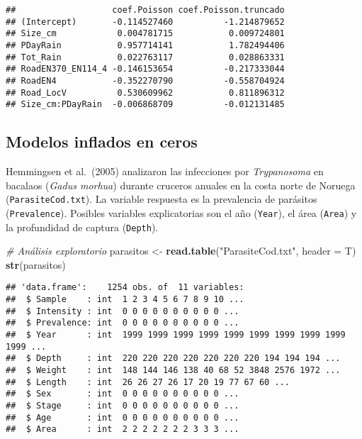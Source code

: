 \documentclass[
]{book}
\newenvironment{Shaded}{\begin{snugshade}}{\end{snugshade}}
\newcommand{\CommentTok}[1]{\textcolor[rgb]{0.56,0.35,0.01}{\textit{#1}}}
\newcommand{\DataTypeTok}[1]{\textcolor[rgb]{0.13,0.29,0.53}{#1}}
\newcommand{\KeywordTok}[1]{\textcolor[rgb]{0.13,0.29,0.53}{\textbf{#1}}}
\newcommand{\NormalTok}[1]{#1}
\newcommand{\StringTok}[1]{\textcolor[rgb]{0.31,0.60,0.02}{#1}}
\begin{document}
\begin{verbatim}
##                   coef.Poisson coef.Poisson.truncado
## (Intercept)       -0.114527460          -1.214879652
## Size_cm            0.004781715           0.009724801
## PDayRain           0.957714141           1.782494406
## Tot_Rain           0.022763117           0.028863331
## RoadEN370_EN114_4 -0.146153654          -0.217333044
## RoadEN4           -0.352270790          -0.558704924
## Road_LocV          0.530609962           0.811896312
## Size_cm:PDayRain  -0.006868709          -0.012131485
\end{verbatim}

\hypertarget{modelos-inflados-en-ceros}{%
\subsection{Modelos inflados en ceros}\label{modelos-inflados-en-ceros}}

Hemmingsen et al.~(2005) analizaron las infecciones por \emph{Trypanosoma} en bacalaos (\emph{Gadus morhua}) durante cruceros anuales en la costa norte de Noruega (\texttt{ParasiteCod.txt}). La variable respuesta es la prevalencia de parásitos (\texttt{Prevalence}). Posibles variables explicatorias son el año (\texttt{Year}), el área (\texttt{Area}) y la profundidad de captura (\texttt{Depth}).

\begin{Shaded}
\begin{Highlighting}[]
\CommentTok{# Análisis exploratorio}
\NormalTok{parasitos <-}\StringTok{ }\KeywordTok{read.table}\NormalTok{(}\StringTok{"ParasiteCod.txt"}\NormalTok{, }\DataTypeTok{header =}\NormalTok{ T) }
\KeywordTok{str}\NormalTok{(parasitos)}
\end{Highlighting}
\end{Shaded}

\begin{verbatim}
## 'data.frame':    1254 obs. of  11 variables:
##  $ Sample    : int  1 2 3 4 5 6 7 8 9 10 ...
##  $ Intensity : int  0 0 0 0 0 0 0 0 0 0 ...
##  $ Prevalence: int  0 0 0 0 0 0 0 0 0 0 ...
##  $ Year      : int  1999 1999 1999 1999 1999 1999 1999 1999 1999 1999 ...
##  $ Depth     : int  220 220 220 220 220 220 220 194 194 194 ...
##  $ Weight    : int  148 144 146 138 40 68 52 3848 2576 1972 ...
##  $ Length    : int  26 26 27 26 17 20 19 77 67 60 ...
##  $ Sex       : int  0 0 0 0 0 0 0 0 0 0 ...
##  $ Stage     : int  0 0 0 0 0 0 0 0 0 0 ...
##  $ Age       : int  0 0 0 0 0 0 0 0 0 0 ...
##  $ Area      : int  2 2 2 2 2 2 2 3 3 3 ...
\end{verbatim}
\end{document}
